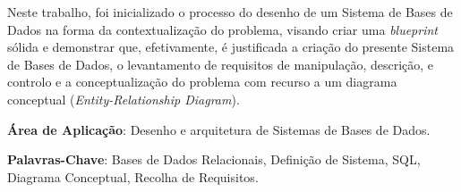 \documentclass[a4paper,12pt]{scrreprt}
\begin{document}


\makecover



    
    






\renewenvironment{abstract}
 {\par\noindent\textbf{\Large\abstractname}\par\bigskip}
 {}

\begin{flushleft}
\begin{abstract}
    Neste trabalho, foi inicializado o processo do desenho de um Sistema de
    Bases de Dados na forma da contextualiza\c{c}\~ao do problema, visando
    criar uma \textit{blueprint} s\'olida e demonstrar que, efetivamente,
    \'e justificada a cria\c{c}\~ao do presente Sistema de Bases de Dados,
    o levantamento de requisitos de manipulação, descrição, e controlo e a
    conceptualização do problema com recurso a um diagrama conceptual
    (\textit{Entity-Relationship Diagram}).
    \par \textbf{\'Area de Aplicação}: Desenho e arquitetura de Sistemas de
    Bases de Dados.
    \par \textbf{Palavras-Chave}: Bases de Dados Relacionais,
    Defini\c{c}\~ao de Sistema, SQL, Diagrama Conceptual,
    Recolha de Requisitos.
\end{abstract}
\end{flushleft}
\end{document}
